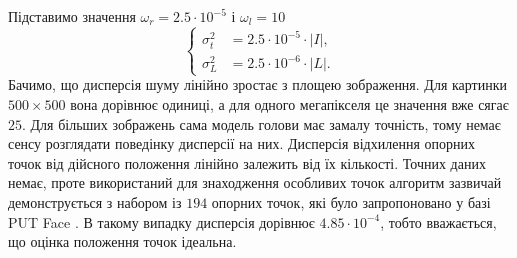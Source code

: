 Підставимо значення $\omega_r = 2.5 \cdot 10^{-5}$ і $\omega_l = 10$
\begin{equation*}
  \begin{cases}
    \sigma^2_t &= 2.5 \cdot 10^{-5} \cdot \left| I \right|, \\
    \sigma_L^2 &= 2.5 \cdot 10^{-6} \cdot \left| L \right|.
  \end{cases}
\end{equation*}
Бачимо,
що дисперсія шуму лінійно зростає з площею зображення.
Для картинки $500 \times 500$ вона дорівнює одиниці,
а для одного мегапікселя це значення вже сягає $25$.
Для більших зображень сама модель голови має замалу точність,
тому немає сенсу розглядати поведінку дисперсії на них.
Дисперсія відхилення опорних точок від дійсного положення
лінійно залежить від їх кількості.
Точних даних немає,
проте використаний для знаходження особливих точок алгоритм
зазвичай демонструється з набором із $194$ опорних точок,
які було запропоновано у базі PUT Face \cite{put-face:2008}.
В такому випадку дисперсія дорівнює $4.85 \cdot 10^{-4}$,
тобто вважається, що оцінка положення точок ідеальна.
